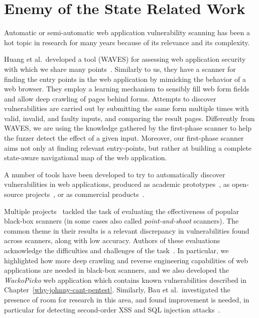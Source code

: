 \section{Enemy of the State Related Work}

Automatic or semi-automatic web application vulnerability scanning has been a
hot topic in research for many years because of its relevance and its
complexity. 

Huang et al.\ developed a tool (WAVES) for assessing web application
security with which we share many points~\cite{huang03:web}. Similarly to us, they have a scanner
for finding the entry points in the web application by mimicking the behavior of
a web browser. They employ a learning mechanism to sensibly fill
web form fields and allow deep crawling of pages behind forms. Attempts to
discover vulnerabilities are carried out by submitting the same form multiple
times with valid, invalid, and faulty inputs, and comparing the result pages.
Differently from WAVES, we are using the knowledge gathered by the first-phase
scanner to help the fuzzer detect the effect of a given input. Moreover,
our first-phase scanner aims not only at finding relevant entry-points, but
rather at building a complete state-aware navigational map of the web
application.

A number of tools have been developed to try to automatically discover
vulnerabilities in web applications, produced as academic
prototypes~\cite{kals06:secubat, halfond09:penetration, jovanovic10:static,
huang04:securing, balzarotti08:saner, felmetsger10:logic, li12:sentinel}, as open-source
projects~\cite{w3af, grendelscan, paros}, or as commercial
products~\cite{acunetix, appscan, burp, webinspect}.

Multiple projects~\cite{bau10:state, suto10:webscanners,
  vieira09} tackled the task of evaluating the effectiveness of popular
black-box scanners (in some cases also called \emph{point-and-shoot} scanners).
The common theme in their results is a relevant discrepancy in vulnerabilities
found across scanners, along with low accuracy. Authors of these evaluations
acknowledge the difficulties and challenges of the
task~\cite{grossman04, vieira09}. In particular, we
highlighted how more deep crawling and reverse engineering capabilities of web
applications are needed in black-box scanners, and we also developed the
\emph{WackoPicko} web application which contains known vulnerabilities described in Chapter~\ref{why-johnny-cant-pentest}. Similarly, Bau
et al.\ investigated the presence of room for research in this area, and found
improvement is needed, in particular for detecting second-order XSS and SQL
injection attacks~\cite{bau10:state}.

